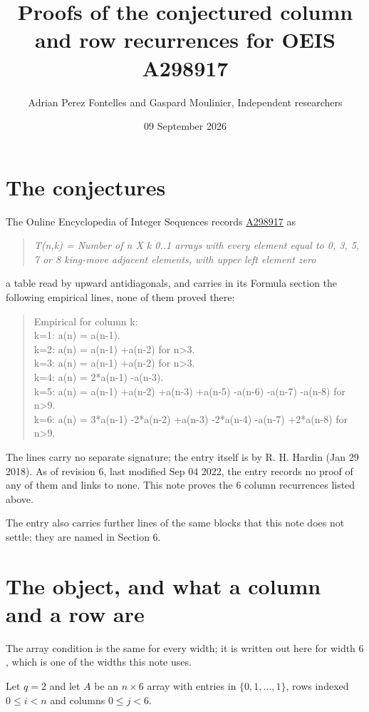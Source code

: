 \documentclass[11pt]{article}
\title{Proofs of the conjectured column and row recurrences for OEIS A298917}
\author{Adrian Perez Fontelles and Gaspard Moulinier, Independent researchers}
\date{09 September 2026}
\theoremstyle{definition}
\begin{document}
\maketitle
\section{The conjectures}

The Online Encyclopedia of Integer Sequences records \href{https://oeis.org/A298917}{A298917} as

\begin{quote}\itshape T(n,k) = Number of n X k 0..1 arrays with every element equal to 0, 3, 5, 7 or 8 king-move adjacent elements, with upper left element zero\end{quote}

a table read by upward antidiagonals, and carries in its Formula section the following empirical lines, none of them proved there:

\begin{quote}\ttfamily Empirical for column k:\\
k=1: a(n) = a(n-1).\\k=2: a(n) = a(n-1) +a(n-2) for n>3.\\k=3: a(n) = a(n-1) +a(n-2) for n>3.\\k=4: a(n) = 2*a(n-1) -a(n-3).\\k=5: a(n) = a(n-1) +a(n-2) +a(n-3) +a(n-5) -a(n-6) -a(n-7) -a(n-8) for n>9.\\k=6: a(n) = 3*a(n-1) -2*a(n-2) +a(n-3) -2*a(n-4) -a(n-7) +2*a(n-8) for n>9.\end{quote}

The lines carry no separate signature; the entry itself is by R. H. Hardin (Jan 29 2018). As of revision 6, last modified Sep 04 2022, the entry records no proof of any of them and links to none. This note proves the 6 column recurrences listed above.

The entry also carries further lines of the same blocks that this note does not settle; they are named in Section 6.

\section{The object, and what a column and a row are}

The array condition is the same for every width; it is written out here for width $6$, which is one of the widths this note uses.

Let $q = 2$ and let $A$ be an $n \times 6$ array with entries in $\{0,1,\dots,1\}$, rows indexed $0 \le i < n$ and columns $0 \le j < 6$.
\end{document}
